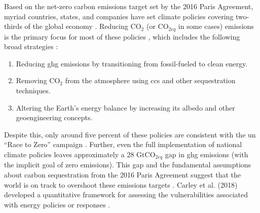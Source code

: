 Based on the net-zero carbon emissions target set by the 2016 Paris Agreement,
myriad countries, states, and companies have set climate policies covering
two-thirds of the global economy \cite{hale_assessing_2022}. Reducing CO$_2$ (or
CO$_{2eq}$ in some cases) emissions is the primary focus for most of these
policies \cite{fawzy_strategies_2020, roelfsema_taking_2020,
hale_assessing_2022}, which includes the following broad strategies
\cite{fawzy_strategies_2020}:
\begin{enumerate}
    \item Reducing \ac{ghg} emissions by transitioning from fossil-fueled to
    clean energy.
    \item Removing CO$_2$ from the atmosphere using \ac{ccs} and other
    sequestration techniques.
    \item Altering the Earth's energy balance by increasing its albedo and other
    geoengineering concepts.
\end{enumerate}
Despite this, only around five percent of these policies are consistent with
the \ac{un} ``Race to Zero'' campaign
\cite{hale_assessing_2022}. Further, even the full implementation of national
climate policies leaves approximately  a 28 GtCO$_{2eq}$ gap in \ac{ghg}
emissions \cite{roelfsema_taking_2020} (with the implicit goal of zero emissions). 
This gap and the fundamental assumptions
about carbon sequestration from the 2016 Paris Agreement suggest that the world
is on track to overshoot these emissions targets
\cite{roelfsema_taking_2020,taylor_managing_2021}. Carley et al. (2018)
developed a quantitative framework for assessing the vulnerabilities associated
with energy policies or responses \cite{carley_framework_2018}.


